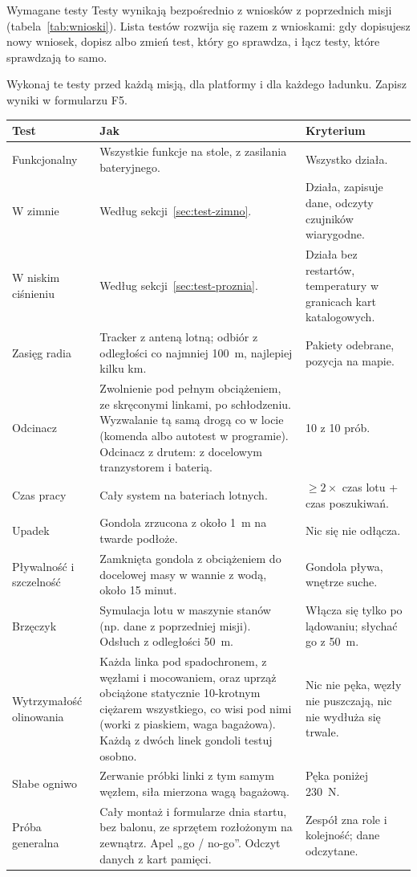 \begin{sekcja}{Wymagane testy}\label{sec:testy}
Testy wynikają bezpośrednio z wniosków z poprzednich misji (tabela~\ref{tab:wnioski}). Lista testów rozwija się razem z wnioskami: gdy dopisujesz nowy wniosek, dopisz albo zmień test, który go sprawdza, i łącz testy, które sprawdzają to samo.

Wykonaj te testy przed każdą misją, dla platformy i dla każdego ładunku. Zapisz wyniki w formularzu F5.

\renewcommand{\arraystretch}{1.3}
\small
\begin{tabularx}{\linewidth}{@{}P{38mm}LP{30mm}@{}}
\toprule
\textbf{Test} & \textbf{Jak} & \textbf{Kryterium}\\\midrule
Funkcjonalny & Wszystkie funkcje na stole, z zasilania bateryjnego. & Wszystko działa.\\
W zimnie & Według sekcji~\ref{sec:test-zimno}. & Działa, zapisuje dane, odczyty czujników wiarygodne.\\
W niskim ciśnieniu & Według sekcji~\ref{sec:test-proznia}. & Działa bez restartów, temperatury w granicach kart katalogowych.\\
Zasięg radia & Tracker z anteną lotną; odbiór z odległości co najmniej \SI{100}{m}, najlepiej kilku km. & Pakiety odebrane, pozycja na mapie.\\
Odcinacz & Zwolnienie pod pełnym obciążeniem, ze skręconymi linkami, po schłodzeniu. Wyzwalanie tą samą drogą co w locie (komenda albo autotest w programie). Odcinacz z drutem: z docelowym tranzystorem i baterią. & 10 z 10 prób.\\
Czas pracy & Cały system na bateriach lotnych. & $\geq 2\times$ czas lotu + czas poszukiwań.\\
Upadek & Gondola zrzucona z około \SI{1}{m} na twarde podłoże. & Nic się nie odłącza.\\
Pływalność i szczelność & Zamknięta gondola z obciążeniem do docelowej masy w wannie z wodą, około 15 minut. & Gondola pływa, wnętrze suche.\\
Brzęczyk & Symulacja lotu w maszynie stanów (np. dane z poprzedniej misji). Odsłuch z odległości \SI{50}{m}. & Włącza się tylko po lądowaniu; słychać go z \SI{50}{m}.\\
Wytrzymałość olinowania & Każda linka pod spadochronem, z węzłami i mocowaniem, oraz uprząż obciążone statycznie 10-krotnym ciężarem wszystkiego, co wisi pod nimi (worki z piaskiem, waga bagażowa). Każdą z dwóch linek gondoli testuj osobno. & Nic nie pęka, węzły nie puszczają, nic nie wydłuża się trwale.\\
Słabe ogniwo & Zerwanie próbki linki z tym samym węzłem, siła mierzona wagą bagażową. & Pęka poniżej \SI{230}{N}.\\
Próba generalna & Cały montaż i formularze dnia startu, bez balonu, ze sprzętem rozłożonym na zewnątrz. Apel „go / no-go”. Odczyt danych z kart pamięci. & Zespół zna role i kolejność; dane odczytane.\\
\bottomrule
\end{tabularx}
\normalsize

\end{sekcja}

